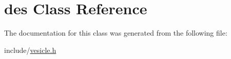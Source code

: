\hypertarget{classdes}{
\section{des Class Reference}
\label{classdes}
}


The documentation for this class was generated from the following file:\begin{DoxyCompactItemize}
\item 
include/\hyperlink{vesicle_8h}{vesicle.h}\end{DoxyCompactItemize}
